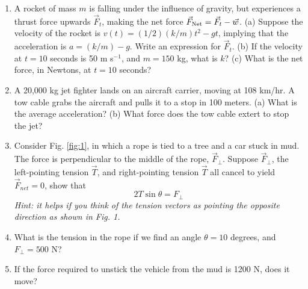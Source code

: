 \documentclass{article}
\begin{document}
\begin{enumerate}
\item A rocket of mass $m$ is falling under the influence of gravity, but experiences a thrust force upwards $\vec{F}_t$, making the net force $\vec{F}_{\rm Net} = \vec{F}_t-\vec{w}$.  (a) Suppose the velocity of the rocket is $v(t) = (1/2) (k/m)t^2 - gt$, implying that the acceleration is $a = (k/m) - g$.  Write an expression for $\vec{F}_t$. (b) If the velocity at $t=10$ seconds is 50 m s$^{-1}$, and $m = 150$ kg, what is $k$? (c) What is the net force, in Newtons, at $t=10$ seconds? \\ \vspace{5cm}
\item A 20,000 kg jet fighter lands on an aircraft carrier, moving at 108 km/hr. A tow cable grabs the aircraft and pulls it to a stop in 100 meters. (a) What is the average acceleration? (b) What force does the tow cable extert to stop the jet? \\ \vspace{4cm}
\item Consider Fig. \ref{fig:1}, in which a rope is tied to a tree and a car stuck in mud.  The force is perpendicular to the middle of the rope, $\vec{F}_{\perp}$.  Suppose $\vec{F}_{\perp}$, the left-pointing tension $\vec{T}$, and right-pointing tension $\vec{T}$ all cancel to yield $\vec{F}_{net} = 0$, show that
\begin{equation}
2T\sin\theta = F_{\perp}
\end{equation}
\textit{Hint: it helps if you think of the tension vectors as pointing the opposite direction as shown in Fig. 1.} \\ \vspace{4cm}
\item What is the tension in the rope if we find an angle $\theta = 10$ degrees, and $F_{\perp} = 500$ N? \\ \vspace{3cm}
\item If the force required to unstick the vehicle from the mud is 1200 N, does it move?
\end{enumerate}
\end{document}
